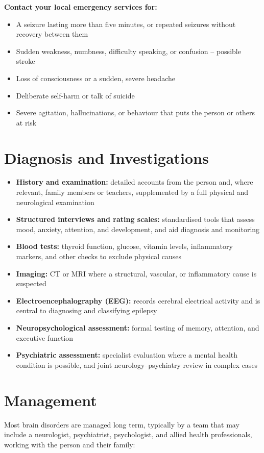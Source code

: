 \textbf{Contact your local emergency services for:}
\begin{itemize}
    \item A seizure lasting more than five minutes, or repeated seizures without recovery between them
    \item Sudden weakness, numbness, difficulty speaking, or confusion -- possible stroke
    \item Loss of consciousness or a sudden, severe headache
    \item Deliberate self-harm or talk of suicide
    \item Severe agitation, hallucinations, or behaviour that puts the person or others at risk
\end{itemize}

\section*{Diagnosis and Investigations}
\begin{itemize}
    \item \textbf{History and examination:} detailed accounts from the person and, where relevant, family members or teachers, supplemented by a full physical and neurological examination
    \item \textbf{Structured interviews and rating scales:} standardised tools that assess mood, anxiety, attention, and development, and aid diagnosis and monitoring
    \item \textbf{Blood tests:} thyroid function, glucose, vitamin levels, inflammatory markers, and other checks to exclude physical causes
    \item \textbf{Imaging:} CT or MRI where a structural, vascular, or inflammatory cause is suspected
    \item \textbf{Electroencephalography (EEG):} records cerebral electrical activity and is central to diagnosing and classifying epilepsy
    \item \textbf{Neuropsychological assessment:} formal testing of memory, attention, and executive function
    \item \textbf{Psychiatric assessment:} specialist evaluation where a mental health condition is possible, and joint neurology--psychiatry review in complex cases
\end{itemize}

\section*{Management}
Most brain disorders are managed long term, typically by a team that may include a neurologist, psychiatrist, psychologist, and allied health professionals, working with the person and their family:

